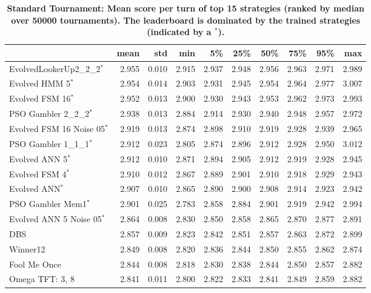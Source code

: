 \documentclass[10pt,letterpaper]{article}
\begin{document}
\begin{table}[!hbtp]
        \centering
        \footnotesize
\begin{tabular}{lrrrrrrrrr}
\toprule
{} &   mean &    std &    min &     5\% &    25\% &    50\% &    75\% &    95\% &    max \\
\midrule
EvolvedLookerUp2\_2\_2$^{*}$    &  2.955 &  0.010 &  2.915 &  2.937 &  2.948 &  2.956 &  2.963 &  2.971 &  2.989 \\
Evolved HMM 5$^{*}$           &  2.954 &  0.014 &  2.903 &  2.931 &  2.945 &  2.954 &  2.964 &  2.977 &  3.007 \\
Evolved FSM 16$^{*}$          &  2.952 &  0.013 &  2.900 &  2.930 &  2.943 &  2.953 &  2.962 &  2.973 &  2.993 \\
PSO Gambler 2\_2\_2$^{*}$       &  2.938 &  0.013 &  2.884 &  2.914 &  2.930 &  2.940 &  2.948 &  2.957 &  2.972 \\
Evolved FSM 16 Noise 05$^{*}$ &  2.919 &  0.013 &  2.874 &  2.898 &  2.910 &  2.919 &  2.928 &  2.939 &  2.965 \\
PSO Gambler 1\_1\_1$^{*}$       &  2.912 &  0.023 &  2.805 &  2.874 &  2.896 &  2.912 &  2.928 &  2.950 &  3.012 \\
Evolved ANN 5$^{*}$           &  2.912 &  0.010 &  2.871 &  2.894 &  2.905 &  2.912 &  2.919 &  2.928 &  2.945 \\
Evolved FSM 4$^{*}$           &  2.910 &  0.012 &  2.867 &  2.889 &  2.901 &  2.910 &  2.918 &  2.929 &  2.943 \\
Evolved ANN$^{*}$             &  2.907 &  0.010 &  2.865 &  2.890 &  2.900 &  2.908 &  2.914 &  2.923 &  2.942 \\
PSO Gambler Mem1$^{*}$        &  2.901 &  0.025 &  2.783 &  2.858 &  2.884 &  2.901 &  2.919 &  2.942 &  2.994 \\
Evolved ANN 5 Noise 05$^{*}$  &  2.864 &  0.008 &  2.830 &  2.850 &  2.858 &  2.865 &  2.870 &  2.877 &  2.891 \\
DBS                           &  2.857 &  0.009 &  2.823 &  2.842 &  2.851 &  2.857 &  2.863 &  2.872 &  2.899 \\
Winner12                      &  2.849 &  0.008 &  2.820 &  2.836 &  2.844 &  2.850 &  2.855 &  2.862 &  2.874 \\
Fool Me Once                  &  2.844 &  0.008 &  2.818 &  2.830 &  2.838 &  2.844 &  2.850 &  2.857 &  2.882 \\
Omega TFT: 3, 8               &  2.841 &  0.011 &  2.800 &  2.822 &  2.833 &  2.841 &  2.849 &  2.859 &  2.882 \\
\bottomrule
\end{tabular}
        \caption{\bf Standard Tournament: Mean score per turn of top 15 strategies
            (ranked by median over 50000 tournaments).
        The leaderboard is dominated by the trained strategies (indicated by a
        $^{*}$).}
        \label{tbl:standard_score}
\end{table}
\end{document}
